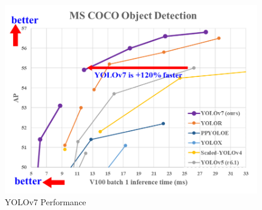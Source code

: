 \documentclass[acmtog, authorversion]{acmart}
\begin{document}
\begin{figure}[H]
 \includegraphics[width=1\columnwidth]{performance.png}
 \caption{YOLOv7 Performance}
 \label{fig: Yolov7chart}
\end{figure}
\end{document}
